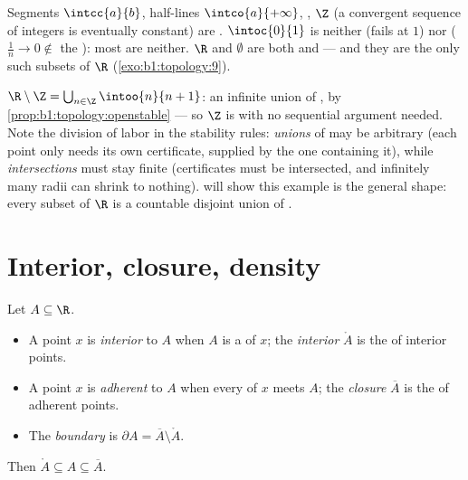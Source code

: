 \begin{example}\label{ex:b1:topology:closed}
Segments $\intcc{a}{b}$, half-lines $\intco{a}{+\infty}$, , $\Z$ (a convergent sequence of integers is eventually constant)
are . $\intoc{0}{1}$ is neither  (fails at $1$) nor 
($\frac 1n \to 0 \notin$ the ): most  are neither. $\R$ and
$\emptyset$ are both  and  --- and they are the only such
subsets of $\R$ (\cref{exo:b1:topology:9}).
\end{example}

\begin{example}\label{ex:b1:topology:rminusz}
$\R \setminus \Z = \bigcup_{n \in \Z} \intoo{n}{n+1}$: an
infinite union of  ,  by
\cref{prop:b1:topology:openstable} --- so $\Z$ is  with no
sequential argument needed. Note the division of labor in the
stability rules: \emph{unions} of  may be arbitrary
(each point only needs its own certificate, supplied by the one
 containing it), while \emph{intersections} must stay finite
(certificates must be intersected, and infinitely many radii can
shrink to nothing).  will show this
example is the general shape: every  subset of $\R$ is a
countable disjoint union of  .
\end{example}

\section{Interior, closure, density}

\begin{definition}\label{def:b1:topology:closure}
Let $A \subseteq \R$.
\begin{itemize}
  \item A point $x$ is \emph{interior} to $A$ when $A$ is a
         of $x$; the \emph{interior}
        $\mathring{A}$ is the  of interior points.
  \item A point $x$ is \emph{adherent} to $A$ when every 
        of $x$ meets $A$; the \emph{closure}
        $\overline{A}$ is the  of adherent points.
  \item The \emph{boundary} is $\partial A = \overline A \setminus
        \mathring A$.
\end{itemize}
Then $\mathring A \subseteq A \subseteq \overline A$.
\end{definition}

